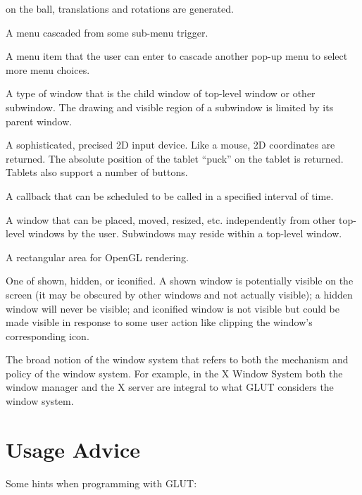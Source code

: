 \begin{description}
on the ball, translations and rotations are generated.
\item[\em \ndx{Sub-menu}]  A menu cascaded from some sub-menu trigger.
\item[\em \ndx{Sub-menu trigger}]  A menu item that the user can enter to
cascade another pop-up menu to select more menu choices.
\item[\em \ndx{Subwindow}]  A type of window that is the child window of
top-level window or other subwindow.  The drawing and visible region
of a subwindow is limited by its parent window.
\item[\em \ndx{Tablet}]  A sophisticated, precised 2D input device.  Like
a mouse, 2D coordinates are returned.  The absolute position of the
tablet ``puck'' on the tablet is returned.  Tablets also support
a number of buttons.
\item[\em \ndx{Timer}]  A callback that can be scheduled to be called in
a specified interval of time.
\item[\em \ndx{Top-level window}]  A window that can be placed, moved, resized,
etc. independently from other top-level windows by the user.
Subwindows may reside within a top-level window.
\item[\em \ndx{Window}]  A rectangular area for OpenGL rendering.
\item[\em \ndx{Window display state}]  One of shown, hidden, or iconified.
A shown window is potentially visible on the screen (it may be obscured
by other windows and not actually visible); a hidden window will
never be visible; and iconified window is not visible but could
be made visible in response to some user action like clipping the
window's corresponding icon.
\item[\em \ndx{Window system}]  The broad notion of the window system
that refers to both the mechanism and policy of the window system.
For example, in the X Window System both the window manager and the
X server are integral to what GLUT considers the window system.
\end{description}



\section{Usage Advice}

Some hints when programming with GLUT:

